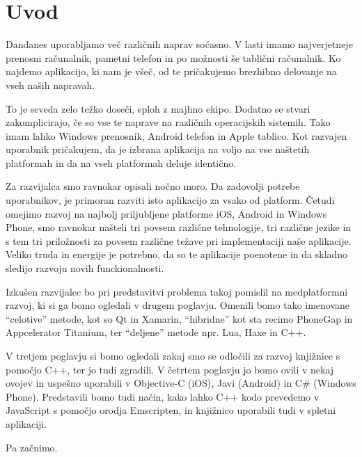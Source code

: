 \graphicspath{{img/}}







\chapter{Uvod}
\label{chap:introduction}


Dandanes uporabljamo več različnih naprav sočasno. V lasti imamo najverjetneje prenosni računalnik, pametni telefon in po možnosti še tablični računalnik. Ko najdemo aplikacijo, ki nam je všeč, od te pričakujemo brezhibno delovanje na vseh naših napravah.

To je seveda zelo težko doseči, sploh z majhno ekipo. Dodatno se stvari zakomplicirajo, če so vse te naprave na različnih operacijskih sistemih. Tako imam lahko Windows prenosnik, Android telefon in Apple tablico. Kot razvajen uporabnik pričakujem, da je izbrana aplikacija na voljo na vse naštetih platformah in da na vseh platformah deluje identično.

Za razvijalca smo ravnokar opisali nočno moro. Da zadovolji potrebe uporabnikov, je primoran razviti isto aplikacijo za vsako od platform. Četudi omejimo razvoj na najbolj priljubljene platforme iOS, Android in Windows Phone, smo ravnokar našteli tri povsem različne tehnologije, tri različne jezike in s tem tri priložnosti za povsem različne težave pri implementaciji naše aplikacije. Veliko truda in energije je potrebno, da so te aplikacije poenotene in da skladno sledijo razvoju novih funckionalnosti.

Izkušen razvijalec bo pri predstavitvi problema takoj pomislil na medplatformni razvoj, ki si ga bomo ogledali v drugem poglavju. Omenili bomo tako imenovane ``celotive'' metode, kot so Qt\cite{qt} in Xamarin\cite{xamarin}, ``hibridne'' kot sta recimo PhoneGap\cite{phonegap} in Appcelerator Titanium\cite{titanium}, ter ``deljene'' metode npr. Lua\cite{lua}, Haxe\cite{haxe} in C++\cite{cpp}.

V tretjem poglavju si bomo ogledali zakaj smo se odločili za razvoj knjižnice s pomočjo C++, ter jo tudi zgradili. V četrtem poglavju jo bomo ovili v nekaj ovojev in uspešno uporabili v Objective-C (iOS), Javi (Android) in C\# (Windows Phone). Predstavili bomo tudi način, kako lahko C++ kodo prevedemo v JavaScript s pomočjo orodja Emscripten\cite{emscripten}, in knjižnico uporabili tudi v spletni aplikaciji.

Pa začnimo.
